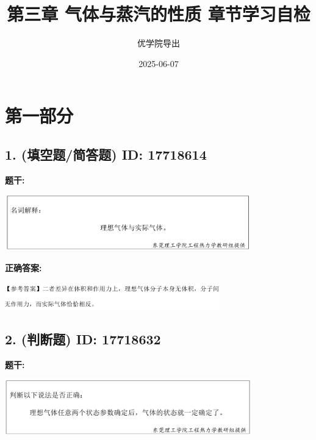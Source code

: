 \documentclass[12pt]{article}
\title{第三章 气体与蒸汽的性质 章节学习自检}
\author{优学院导出}
\date{2025-06-07}
\begin{document}
\maketitle

\section*{第一部分}
\hrulefill

\subsection*{1. (填空题/简答题) \small ID: 17718614}

\textbf{题干:}


\begin{center}\includegraphics[width=0.8\textwidth, height=0.25\textheight, keepaspectratio]{question_1_17718614/title_img_1.png}\end{center}

\textbf{正确答案:}

\begin{center}\includegraphics[width=0.7\textwidth, height=0.2\textheight, keepaspectratio]{question_1_17718614/correct_answer_1_img_1.png}\end{center}

\vspace{0.5em}\hrulefill\vspace{1em}

\subsection*{2. (判断题) \small ID: 17718632}

\textbf{题干:}


\begin{center}\includegraphics[width=0.8\textwidth, height=0.25\textheight, keepaspectratio]{question_2_17718632/title_img_1.png}\end{center}
\end{document}
